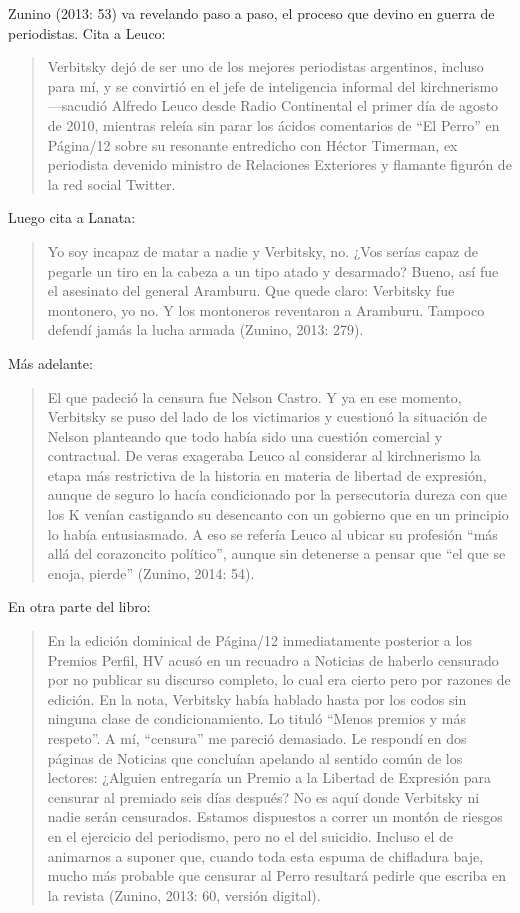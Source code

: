 {Zunino (2013: 53) va revelando paso a paso, el proceso que devino en guerra de periodistas. Cita a Leuco:

\begin{quote}
Verbitsky dejó de ser uno de los mejores periodistas argentinos, incluso para mí, y se convirtió en el jefe de inteligencia informal del kirchnerismo ---sacudió Alfredo Leuco desde Radio Continental el primer día de agosto de 2010, mientras releía sin parar los ácidos comentarios de ``El Perro'' en Página/12 sobre su resonante entredicho con Héctor Timerman, ex periodista devenido ministro de Relaciones Exteriores y flamante figurón de la red social Twitter.
\end{quote}

Luego cita a Lanata:

\begin{quote}
Yo soy incapaz de matar a nadie y Verbitsky, no. ¿Vos serías capaz de pegarle un tiro en la cabeza a un tipo atado y desarmado? Bueno, así fue el asesinato del general Aramburu. Que quede claro: Verbitsky fue montonero, yo no. Y los montoneros reventaron a Aramburu. Tampoco defendí jamás la lucha armada (Zunino, 2013: 279).
\end{quote}

Más adelante:

\begin{quote}
El que padeció la censura fue Nelson Castro. Y ya en ese momento, Verbitsky se puso del lado de los victimarios y cuestionó la situación de Nelson planteando que todo había sido una cuestión comercial y contractual. De veras exageraba Leuco al considerar al kirchnerismo la etapa más restrictiva de la historia en materia de libertad de expresión, aunque de seguro lo hacía condicionado por la persecutoria dureza con que los K venían castigando su desencanto con un gobierno que en un principio lo había entusiasmado. A eso se refería Leuco al ubicar su profesión ``más allá del corazoncito político'', aunque sin detenerse a pensar que ``el que se enoja, pierde'' (Zunino, 2014: 54).
\end{quote}

En otra parte del libro:

\begin{quote}
En la edición dominical de Página/12 inmediatamente posterior a los Premios Perfil, HV acusó en un recuadro a Noticias de haberlo censurado por no publicar su discurso completo, lo cual era cierto pero por razones de edición. En la nota, Verbitsky había hablado hasta por los codos sin ninguna clase de condicionamiento. Lo tituló ``Menos premios y más respeto''. A mí, ``censura'' me pareció demasiado. Le respondí en dos páginas de Noticias que concluían apelando al sentido común de los lectores: ¿Alguien entregaría un Premio a la Libertad de Expresión para censurar al premiado seis días después? No es aquí donde Verbitsky ni nadie serán censurados. Estamos dispuestos a correr un montón de riesgos en el ejercicio del periodismo, pero no el del suicidio. Incluso el de animarnos a suponer que, cuando toda esta espuma de chifladura baje, mucho más probable que censurar al Perro resultará pedirle que escriba en la revista (Zunino, 2013: 60, versión digital).
\end{quote}

}
